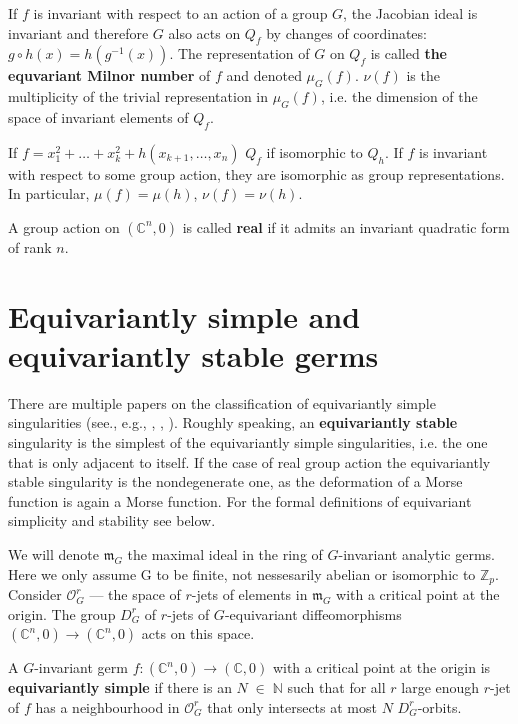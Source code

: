 \documentclass{amsart}
\begin{document}
If $f$ is invariant with respect to an action of a group $G$, the Jacobian ideal is invariant and therefore $G$ also acts on $Q_f$ by changes of coordinates: $g \circ h(x) = h ( g^{-1} (x))$. The representation of $G$ on $Q_f$ is called \textbf{the equvariant Milnor number} of $f$ and denoted $\mu_G(f)$. $\nu(f)$ is the multiplicity of the trivial representation in $\mu_G(f)$, i.e. the dimension of the space of invariant elements of $Q_f$.

If $f=x_1^2 + \ldots + x_k^2 + h(x_{k+1}, \ldots, x_n)$ $Q_f$ if isomorphic to $Q_h$. If $f$ is invariant with respect to some group action, they are isomorphic as group representations. In particular, $\mu(f) = \mu(h)$, $\nu(f) = \nu(h)$.

A group action on $(\mathbb{C}^n, 0)$  is called \textbf{real} if it admits an invariant quadratic form of rank $n$.



\section{Equivariantly simple and equivariantly stable germs}


There are multiple papers on the classification of equivariantly simple singularities (see., e.g., \cite{3}, \cite{4}, \cite{5}). Roughly speaking, an \textbf{equivariantly stable} singularity is the simplest of the equivariantly simple singularities, i.e. the one that is only adjacent to itself. If the case of real group action the equivariantly stable singularity is the nondegenerate one, as the deformation of a Morse function is again a Morse function. For the formal definitions of equivariant simplicity and stability see below.


We will denote $\mathfrak{m}_G$ the maximal ideal in the ring of $G$-invariant analytic germs. Here we only assume G to be finite, not nessesarily abelian or isomorphic to $\mathbb{Z}_p$. Consider $\mathcal{O}^{r}_{G}$ --- the space of $r$-jets of elements in $\mathfrak{m}_G$ with a critical point at the origin.  The group $D^r_G$ of $r$-jets of  $G$-equivariant diffeomorphisms  $(\mathbb{C}^n,0) \longrightarrow (\mathbb{C}^n,0)$ acts on this space.

A $G$-invariant germ $f:(\mathbb{C}^n,0) \longrightarrow (\mathbb{C},0)$ with a critical point at the origin is \textbf{equivariantly simple} if there is an $N \; \in \; \mathbb{N}$ such that for all $r$ large enough  $r$-jet of $f$ has a neighbourhood in $\mathcal{O}^{r}_{G}$ that only intersects at most $N$ $D^r_G$-orbits.
\end{document}
